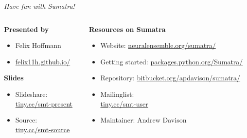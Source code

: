 

\begin{frame}
  \begin{center} 
    \Large \textit{Have fun with Sumatra!}
  \end{center}
  
  \vspace{0.35cm}

  \begin{columns}[t]
    \begin{column}{0.4\textwidth}        
      \textbf{Presented by}
      \normalsize
      \vspace{0.18cm}
      \begin{itemize}[leftmargin=0.6cm]
        \item[] Felix Hoffmann
        \item[] \href{http://felix11h.github.io/}{felix11h.github.io/}
      \end{itemize}

      \vspace{0.38cm}
      \textbf{Slides}
      \normalsize
      \vspace{0.18cm}
      \begin{itemize}[leftmargin=0.6cm]
        \item[] Slideshare:\\ %
          \href{http://tiny.cc/smt-present}{tiny.cc/smt-present}
        \item[] Source:\\ %
          \href{http://tiny.cc/smt-source}{tiny.cc/smt-source}
      \end{itemize}
    \end{column}
    \begin{column}{0.64\textwidth}
      \textbf{Resources on Sumatra}
      \vspace{0.28cm}
      \normalsize 
      \begin{itemize}[leftmargin=0.6cm]
        \item[] Website: %
          \href{http://neuralensemble.org/sumatra/}{%
            neuralensemble.org/sumatra/}\\
        \item[]Getting started: %
          \href{http://packages.python.org/Sumatra/}{%
            packages.python.org/Sumatra/}\\
        \item[]Repository: %
          \href{http://bitbucket.org/apdavison/sumatra/}{%
            bitbucket.org/apdavison/sumatra/}
        \item[] Mailinglist: \\%
          \href{http://tiny.cc/smt-user}{tiny.cc/smt-user}
        \item[] Maintainer: Andrew Davison 
      \end{itemize}
    \end{column}
  \end{columns}


\end{frame}
